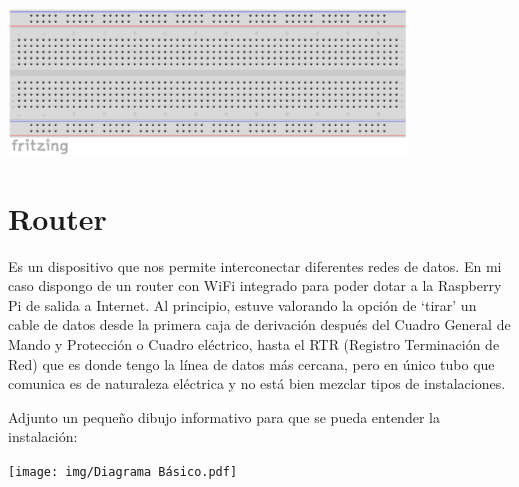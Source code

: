 \begin{itemize}
\begin{center}
\includegraphics[width=400]{img/protoboard.pdf}
\end{center}

\section{Router}
Es un dispositivo que nos permite interconectar diferentes redes de datos. En mi caso dispongo de un router con WiFi integrado para poder dotar a la Raspberry Pi de salida a Internet.
Al principio, estuve valorando la opción de ‘tirar’ un cable de datos desde la primera caja de derivación después del Cuadro General de Mando y Protección o Cuadro eléctrico, hasta el RTR (Registro Terminación de Red) que es donde tengo la línea de datos más cercana, pero en único tubo que comunica es de naturaleza eléctrica y no está bien mezclar tipos de instalaciones.

Adjunto un pequeño dibujo informativo para que se pueda entender la instalación:
\begin{center}
\texttt{[image: img/Diagrama Básico.pdf]}
\end{center}


\end{itemize}

